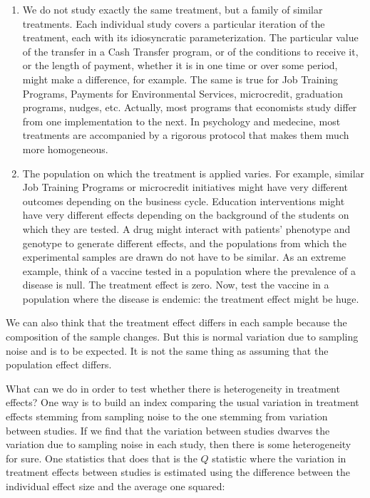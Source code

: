 \documentclass[]{book}
\providecommand{\tightlist}{%
  \setlength{\itemsep}{0pt}\setlength{\parskip}{0pt}}
\theoremstyle{definition}
\theoremstyle{definition}
\theoremstyle{definition}
\theoremstyle{remark}
\begin{document}
\begin{enumerate}
\def\labelenumi{\arabic{enumi}.}
\tightlist
\item
  We do not study exactly the same treatment, but a family of similar
  treatments. Each individual study covers a particular iteration of the
  treatment, each with its idiosyncratic parameterization. The
  particular value of the transfer in a Cash Transfer program, or of the
  conditions to receive it, or the length of payment, whether it is in
  one time or over some period, might make a difference, for example.
  The same is true for Job Training Programs, Payments for Environmental
  Services, microcredit, graduation programs, nudges, etc. Actually,
  most programs that economists study differ from one implementation to
  the next. In psychology and medecine, most treatments are accompanied
  by a rigorous protocol that makes them much more homogeneous.
\item
  The population on which the treatment is applied varies. For example,
  similar Job Training Programs or microcredit initiatives might have
  very different outcomes depending on the business cycle. Education
  interventions might have very different effects depending on the
  background of the students on which they are tested. A drug might
  interact with patients' phenotype and genotype to generate different
  effects, and the populations from which the experimental samples are
  drawn do not have to be similar. As an extreme example, think of a
  vaccine tested in a population where the prevalence of a disease is
  null. The treatment effect is zero. Now, test the vaccine in a
  population where the disease is endemic: the treatment effect might be
  huge.
\end{enumerate}

We can also think that the treatment effect differs in each sample
because the composition of the sample changes. But this is normal
variation due to sampling noise and is to be expected. It is not the
same thing as assuming that the population effect differs.

What can we do in order to test whether there is heterogeneity in
treatment effects? One way is to build an index comparing the usual
variation in treatment effects stemming from sampling noise to the one
stemming from variation between studies. If we find that the variation
between studies dwarves the variation due to sampling noise in each
study, then there is some heterogeneity for sure. One statistics that
does that is the \(Q\) statistic where the variation in treatment
effects between studies is estimated using the difference between the
individual effect size and the average one squared:
\end{document}
